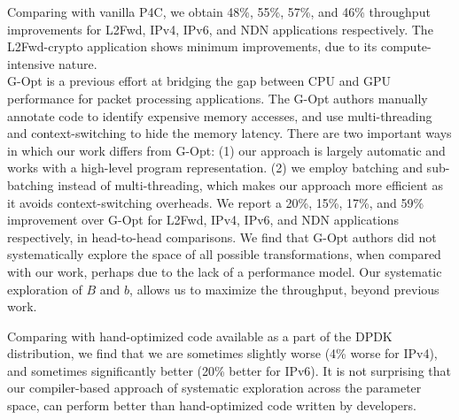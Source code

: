 Comparing with vanilla P4C, we obtain 48\%, 55\%, 57\%, and 46\% throughput improvements for L2Fwd, IPv4, IPv6, and NDN applications respectively.
The L2Fwd-crypto application shows minimum improvements, due to its compute-intensive nature.
\\
G-Opt is a previous effort at bridging the gap between CPU and GPU performance for packet processing
applications. The G-Opt authors manually annotate code to identify expensive memory accesses, and use
multi-threading and context-switching to hide the memory latency. There are two important ways in which
our work differs from G-Opt: (1) our approach is largely automatic and works with a high-level
program representation. (2) we employ batching and sub-batching instead of multi-threading, which
makes our approach more efficient as it avoids context-switching overheads.
We report a 20\%, 15\%, 17\%, and 59\% improvement over G-Opt for L2Fwd, IPv4, IPv6, and NDN applications respectively,
in head-to-head comparisons. We find that G-Opt authors did not systematically explore the space of
all possible transformations, when compared with our work, perhaps due
to the lack of a performance model. Our systematic exploration of $B$ and $b$, allows
us to maximize the throughput, beyond previous work.

Comparing with hand-optimized code available as a part of the DPDK distribution, we find that we are sometimes
slightly worse (4\% worse for IPv4), and sometimes significantly better (20\% better for IPv6). It is not
surprising that our compiler-based approach of systematic exploration across the parameter space, can perform
better than hand-optimized code written by developers.

